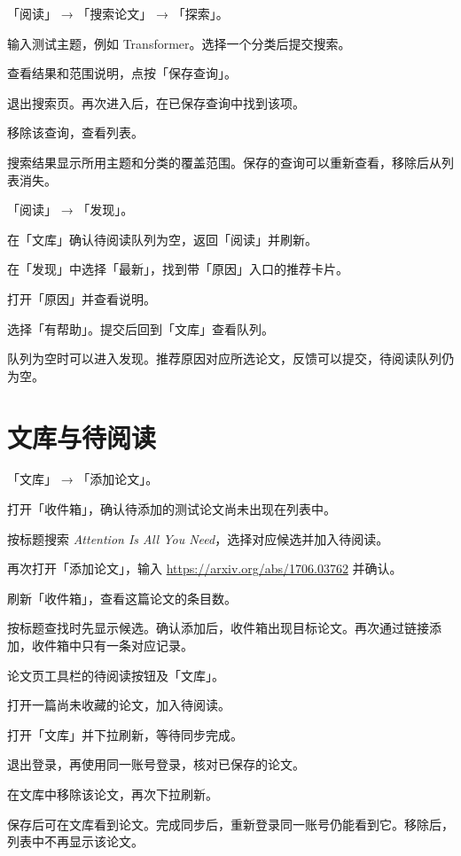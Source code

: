 \documentclass[UTF8,a4paper,zihao=-4,fontset=fandol]{ctexart}
\newcommand{\ui}[1]{「#1」}
\newcommand{\sampletitle}{\textit{Attention Is All You Need}}
\begin{document}
  {\ui{阅读} → \ui{搜索论文} → \ui{探索}。}
  {\item 输入测试主题，例如 Transformer。选择一个分类后提交搜索。
   \item 查看结果和范围说明，点按\ui{保存查询}。
   \item 退出搜索页。再次进入后，在已保存查询中找到该项。
   \item 移除该查询，查看列表。}
  {搜索结果显示所用主题和分类的覆盖范围。保存的查询可以重新查看，移除后从列表消失。}

  {\ui{阅读} → \ui{发现}。}
  {\item 在\ui{文库}确认待阅读队列为空，返回\ui{阅读}并刷新。
   \item 在\ui{发现}中选择\ui{最新}，找到带\ui{原因}入口的推荐卡片。
   \item 打开\ui{原因}并查看说明。
   \item 选择\ui{有帮助}。提交后回到\ui{文库}查看队列。}
  {队列为空时可以进入发现。推荐原因对应所选论文，反馈可以提交，待阅读队列仍为空。}

\clearpage
{}
\section{文库与待阅读}

  {\ui{文库} → \ui{添加论文}。}
  {\item 打开\ui{收件箱}，确认待添加的测试论文尚未出现在列表中。
   \item 按标题搜索 \sampletitle{}，选择对应候选并加入待阅读。
   \item 再次打开\ui{添加论文}，输入 \url{https://arxiv.org/abs/1706.03762} 并确认。
   \item 刷新\ui{收件箱}，查看这篇论文的条目数。}
  {按标题查找时先显示候选。确认添加后，收件箱出现目标论文。再次通过链接添加，收件箱中只有一条对应记录。}

  {论文页工具栏的待阅读按钮及\ui{文库}。}
  {\item 打开一篇尚未收藏的论文，加入待阅读。
   \item 打开\ui{文库}并下拉刷新，等待同步完成。
   \item 退出登录，再使用同一账号登录，核对已保存的论文。
   \item 在文库中移除该论文，再次下拉刷新。}
  {保存后可在文库看到论文。完成同步后，重新登录同一账号仍能看到它。移除后，列表中不再显示该论文。}
\end{document}

